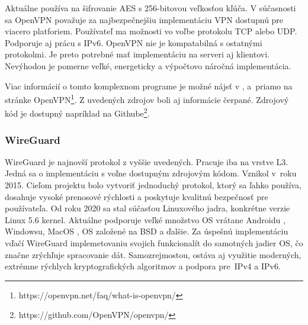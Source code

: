 Aktuálne používa na šifrovanie AES s 256-bitovou veľkosťou kľúča. V súčasnosti sa OpenVPN považuje za najbezpečnejšiu implementáciu VPN dostupnú pre viacero platforiem. Používateľ ma možnosti vo voľbe protokolu TCP alebo UDP. Podporuje aj prácu s IPv6. OpenVPN nie je kompatabilná s ostatnými protokolmi. Je preto potrebné mať implementáciu na serveri aj klientovi. Nevýhodou je pomerne veľké, energeticky a výpočtovo náročná implementácia.

Viac informácií o tomto komplexnom programe je možné nájsť v \cite{vpntech}, \cite{ovpn} a~priamo na stránke OpenVPN\footnote{https://openvpn.net/faq/what-is-openvpn/}. Z uvedených zdrojov boli aj informácie čerpané. Zdrojový kód je dostupný napríklad na Githube\footnote{https://github.com/OpenVPN/openvpn/}. 
\subsubsection{WireGuard}
WireGuard \cite{wireguardpdf} je najnovší protokol z vyššie uvedených. Pracuje iba na vrstve L3. Jedná sa o implementáciu s voľne dostupným zdrojovým kódom. Vznikol v~roku 2015. Cieľom projektu bolo vytvoriť jednoduchý protokol, ktorý sa ľahko používa, dosahuje vysoké prenosové rýchlosti a poskytuje kvalitnú bezpečnosť pre používateľa. Od roku 2020 sa stal súčasťou Linuxového jadra, konkrétne verzie Linux 5.6 kernel. Aktuálne podporuje veľké množstvo OS vrátane Androidu \cite{android}, Windowsu, MacOS \cite{mac}, OS založené na BSD \cite{bsd} a ďalšie. Za úspešnú implementáciu vďačí WireGuard implemetovaniu svojich funkcionalít do samotných jadier OS, čo značne zrýchľuje spracovanie dát. Samozrejmostou, ostáva aj využitie moderných, extrémne rýchlych kryptografických algoritmov a podpora pre~IPv4 a IPv6. 

